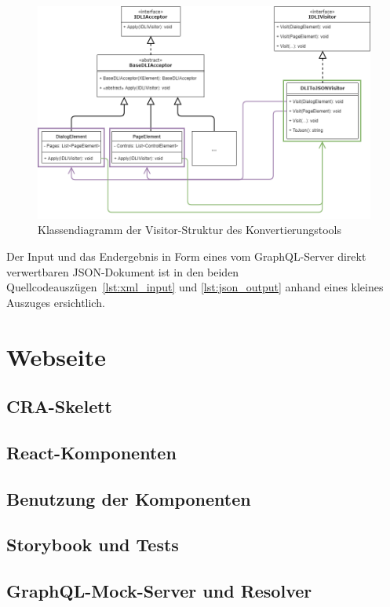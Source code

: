\begin{figure}
    \centering
    \captionsetup{justification=centering}
    \includegraphics[width=\textwidth]{figures/web-converter_class-diagramm.png}
        \caption{Klassendiagramm der Visitor-Struktur des Konvertierungstools}\label{fig:web-conv_class-diagramm}
\end{figure}

Der Input und das Endergebnis in Form eines vom GraphQL-Server direkt verwertbaren JSON-Dokument ist in den beiden Quellcodeauszügen~\ref{lst:xml_input} und \ref{lst:json_output} anhand eines kleines Auszuges ersichtlich. 




\section{Webseite}

\subsection{CRA-Skelett}
\subsection{React-Komponenten}

\subsection{Benutzung der Komponenten}
\subsection{Storybook und Tests}
\subsection{GraphQL-Mock-Server und Resolver}

